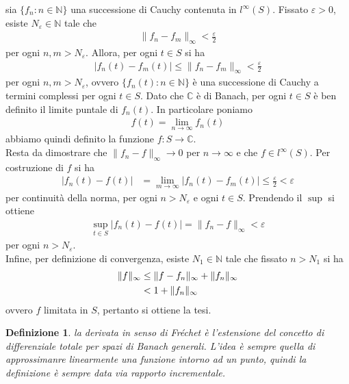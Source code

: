 \documentclass[twoside, 11pt]{amsbook}
\makeatletter
\newcommand{\0}{{(0)}}
\newcommand{\3}{{(3)}}
\theoremstyle{colonplain}
\theoremstyle{colondefinition}
\newtheorem{defn}[thm]{Definizione}
\theoremstyle{colonremark}
\numberwithin{equation}{chapter}
\renewcommand{\proofname}{Dimostrazione}
\renewenvironment{proof}[1][\proofname]{\par
  \pushQED{\qed}%
  \normalfont \topsep6\p@\@plus6\p@\relax
  \trivlist
  \item[\hskip\labelsep\bfseries #1:]\ignorespaces
}{%
  \popQED\endtrivlist\@endpefalse
}
\makeatother
\begin{document}
\begin{proof} sia $\{f_n : n \in \mathbb{N}\}$ una successione di Cauchy contenuta in $l^\infty(S)$. Fissato $\varepsilon > 0$, esiste $N_\varepsilon \in \mathbb{N}$ tale che
\begin{align}
    \|f_n - f_m\|_\infty < \frac{\varepsilon}{2} 
\end{align}
per ogni $n, m > N_\varepsilon$. Allora, per ogni $t \in S$ si ha
\begin{align}
    |f_n(t) - f_m(t)| \leq \|f_n - f_m\|_\infty < \frac{\varepsilon}{2} 
\end{align}
per ogni $n, m > N_\varepsilon$, ovvero $\{f_n(t) : n \in \mathbb{N}\}$ è una successione di Cauchy a termini complessi per ogni $t \in S$. Dato che $\mathbb{C}$ è di Banach, per ogni $t \in S$ è ben definito il limite puntale di $f_n(t)$. In particolare poniamo
\begin{align}
    f(t) = \lim_{n \rightarrow \infty} f_n(t) 
\end{align}
abbiamo quindi definito la funzione $f : S \longrightarrow \mathbb{C}$. \\
Resta da dimostrare che $\|f_n - f\|_\infty \rightarrow 0$ per $n \rightarrow \infty$ e che $f \in l^\infty(S)$. Per costruzione di $f$ si ha
\begin{align}
    |f_n(t) - f(t)| &= \lim_{m \rightarrow \infty} |f_n(t) - f_m(t)| \leq \frac{\varepsilon}{2} < \varepsilon 
\end{align}
per continuità della norma, per ogni $n > N_\varepsilon$ e ogni $t \in S$. Prendendo il $\sup$ si ottiene
\begin{align}
    \sup_{t \in S} |f_n(t) - f(t)| = \|f_n - f\|_\infty < \varepsilon 
\end{align}
per ogni $n > N_\varepsilon$. \\
Infine, per definizione di convergenza, esiste $N_1 \in \mathbb{N}$ tale che fissato $n > N_1$ si ha
\begin{align}
    \|f\|_\infty &\leq \|f - f_n\|_\infty + \|f_n\|_\infty \notag \\
    &< 1 + \|f_n\|_\infty 
\end{align}
ovvero $f$ limitata in $S$, pertanto si ottiene la tesi.
\end{proof}
\begin{defn}\label{FrechDervDefn} la derivata in senso di Fréchet è l'estensione del concetto di differenziale totale per spazi di Banach generali. L'idea è sempre quella di approssimanre linearmente una funzione intorno ad un punto, quindi la definizione è sempre data via rapporto incrementale.
\end{defn}
\end{document}
